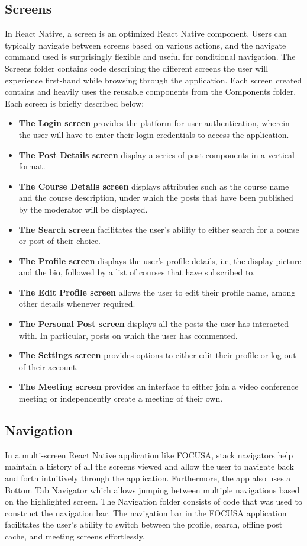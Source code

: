 \subsection{Screens}
In React Native, a screen is an optimized React Native component. Users can typically navigate between screens based on various actions, 
and the navigate command used is surprisingly flexible and useful for conditional navigation.
The Screens folder contains code describing the different screens the user will experience first-hand while browsing through the application. 
Each screen created contains and heavily uses the reusable components from the Components folder. Each screen is briefly described below: 
\begin{itemize}
    \item \textbf{The Login screen} provides the platform for user authentication, wherein the user will have to enter their login credentials to access the application. 
    \item \textbf{The Post Details screen} display a series of post components in a vertical format.
    \item \textbf{The Course Details screen} displays attributes such as the course name and the course description, under which the posts that have been published by the moderator will be displayed. 
    \item \textbf{The Search screen} facilitates the user's ability to either search for a course or post of their choice.
    \item \textbf{The Profile screen} displays the user's profile details, i.e, the display picture and the bio, 
    followed by a list of courses that have subscribed to.
    \item \textbf{The Edit Profile screen} allows the user to edit their profile name, among other details whenever required.
    \item \textbf{The Personal Post screen} displays all the posts the user has interacted with. In particular, posts on which the user has commented.
    \item \textbf{The Settings screen} provides options to either edit their profile or log out of their account.
    \item \textbf{The Meeting screen} provides an interface to either join a video conference meeting or independently create a meeting of their own.
\end{itemize}

\subsection{Navigation}
In a multi-screen React Native application like FOCUSA, stack navigators help maintain a history of all the screens viewed and allow the user to navigate back and forth intuitively through the application. Furthermore, the app also uses a Bottom Tab 
Navigator which allows jumping between multiple navigations based on the highlighted screen.
The Navigation folder consists of code that was used to construct the navigation bar. 
The navigation bar in the FOCUSA application facilitates the user's ability to switch 
between the profile, search, offline post cache, and meeting screens effortlessly.

